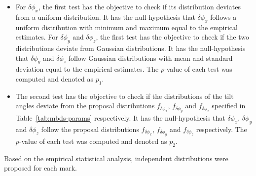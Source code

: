 \documentclass[journal]{IEEEtran}
\begin{document}
\begin{itemize}

\item For $\delta\phi_x$, the first test has the objective to check if
  its distribution deviates from a uniform distribution. It has the
  null-hypothesis that $\delta\phi_x$ follows a uniform distribution
  with minimum and maximum equal to the empirical estimates. For
  $\delta\phi_y$ and $\delta\phi_z$, the first test has the objective
  to check if the two distributions deviate from Gaussian
  distributions. It has the null-hypothesis that $\delta\phi_y$ and
  $\delta\phi_z$ follow Gaussian distributions with mean and standard
  deviation equal to the empirical estimates. The $p$-value of each
  test was computed and denoted as $p_1$.

\item The second test has the objective to check if the distributions
  of the tilt angles deviate from the proposal distributions
  $f_{\delta{\phi_x}}$, $f_{\delta{\phi_y}}$ and $f_{\delta{\phi_z}}$
  specified in Table~\ref{tab:mbds-params} respectively. It has the
  null-hypothesis that $\delta\phi_x$, $\delta\phi_y$ and
  $\delta\phi_z$ follow the proposal distributions
  $f_{\delta{\phi_x}}$, $f_{\delta{\phi_y}}$ and $f_{\delta{\phi_z}}$
  respectively. The $p$-value of each test was computed and denoted as
  $p_2$.

\end{itemize}

Based on the empirical statistical analysis, independent distributions
were proposed for each mark.

%
%
\end{document}
